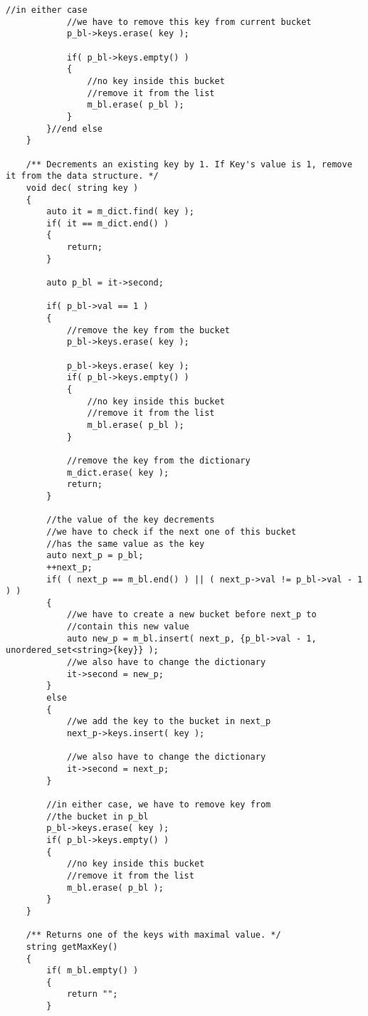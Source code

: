 \begin{lstlisting}[style=customc, caption={Double Linked List and Iterator For Value In Hash Map}]
            //in either case
            //we have to remove this key from current bucket
            p_bl->keys.erase( key );

            if( p_bl->keys.empty() )
            {
                //no key inside this bucket
                //remove it from the list
                m_bl.erase( p_bl );
            }
        }//end else
    }

    /** Decrements an existing key by 1. If Key's value is 1, remove it from the data structure. */
    void dec( string key )
    {
        auto it = m_dict.find( key );
        if( it == m_dict.end() )
        {
            return;
        }

        auto p_bl = it->second;

        if( p_bl->val == 1 )
        {
            //remove the key from the bucket
            p_bl->keys.erase( key );

            p_bl->keys.erase( key );
            if( p_bl->keys.empty() )
            {
                //no key inside this bucket
                //remove it from the list
                m_bl.erase( p_bl );
            }

            //remove the key from the dictionary
            m_dict.erase( key );
            return;
        }

        //the value of the key decrements
        //we have to check if the next one of this bucket
        //has the same value as the key
        auto next_p = p_bl;
        ++next_p;
        if( ( next_p == m_bl.end() ) || ( next_p->val != p_bl->val - 1 ) )
        {
            //we have to create a new bucket before next_p to
            //contain this new value
            auto new_p = m_bl.insert( next_p, {p_bl->val - 1, unordered_set<string>{key}} );
            //we also have to change the dictionary
            it->second = new_p;
        }
        else
        {
            //we add the key to the bucket in next_p
            next_p->keys.insert( key );

            //we also have to change the dictionary
            it->second = next_p;
        }

        //in either case, we have to remove key from
        //the bucket in p_bl
        p_bl->keys.erase( key );
        if( p_bl->keys.empty() )
        {
            //no key inside this bucket
            //remove it from the list
            m_bl.erase( p_bl );
        }
    }

    /** Returns one of the keys with maximal value. */
    string getMaxKey()
    {
        if( m_bl.empty() )
        {
            return "";
        }


\end{lstlisting}
